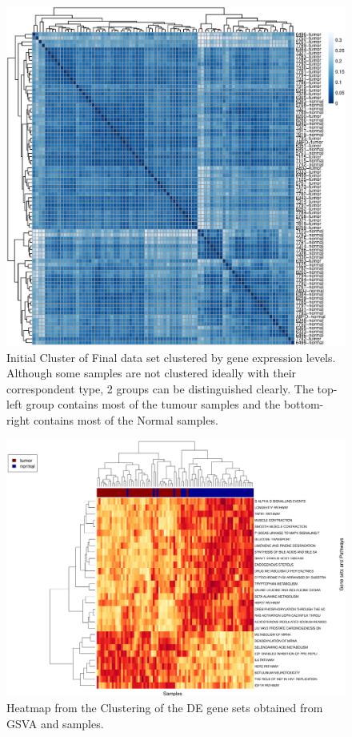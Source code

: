 \documentclass[9pt,twocolumn,twoside]{gsajnl}
\begin{document}
\begin{figure}[htbp]
\centering
\includegraphics[width=\linewidth]{Clustering.eps}
\caption{Initial Cluster of Final data set clustered by gene expression levels. Although some samples are not clustered ideally with their correspondent type, 2 groups can be distinguished clearly. The top-left group contains most of the tumour samples and the bottom-right contains most of the Normal samples.
}%
\label{fig:Clustering}
\end{figure}

\begin{figure}[htbp]
\centering
\includegraphics[width=\linewidth]{ClusteringGSVA.eps}
\caption{Heatmap from the Clustering of the DE gene sets obtained from GSVA and samples.
}
\label{fig:ClusteringGSVA}
\end{figure}
\end{document}
